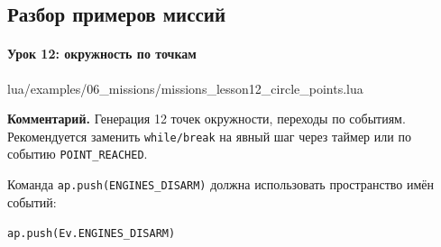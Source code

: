 \subsection{Разбор примеров миссий}
\paragraph{Урок 12: окружность по точкам}
\begin{codefile}{lua/examples/06_missions/missions_lesson12_circle_points.lua}
\end{codefile}
\textbf{Комментарий.} Генерация 12 точек окружности, переходы по событиям. Рекомендуется заменить \texttt{while/break} на явный шаг через таймер или по событию \texttt{POINT\_REACHED}.

Команда \texttt{ap.push(ENGINES\_DISARM)} должна использовать пространство имён событий:
\begin{center}
\texttt{ap.push(Ev.ENGINES\_DISARM)}
\end{center}

